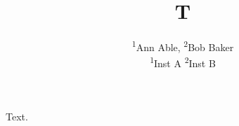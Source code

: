 \documentclass{article}
\begin{document}
\title{T}
\author{\textsuperscript{1}Ann Able, \textsuperscript{2}Bob Baker\\
\textsuperscript{1}Inst A \quad \textsuperscript{2}Inst B}
\maketitle
Text.
\end{document}
